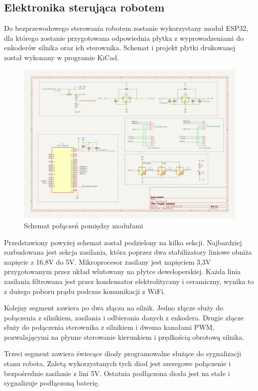 \subsection{Elektronika sterująca robotem}
Do bezprzewodowego sterowania robotem zostanie wykorzystany moduł ESP32, dla którego zostanie przygotowana odpowiednia płytka 
z wyprowadzeniami do enkoderów silnika oraz ich sterownika. Schemat i projekt płytki drukowanej został wykonany w programie KiCad. 
\begin{figure}[H]
	\centering
	\includegraphics[width=18cm]{pages/robot/zdjecia/kicad/schematCaly.png}
	\caption{Schemat połączeń pomiędzy modułami}
	\label{Fig:schematKiCad}
\end{figure}

Przedstawiony powyżej schemat został podzielony na kilka sekcji. 
Najbardziej rozbudowana jest sekcja zasilania, która poprzez dwa stabilizatory liniowe obniża napięcie z 16,8V do 5V. Mikroprocesor zasilany jest
napięciem 3,3V przygotowanym przez układ wlutowany na płytce deweloperskiej. Każda linia zasilania filtrowana jest przez kondensator elektrolityczny 
i ceramiczny, wynika to z dużego poboru prądu podczas komunikacji z WiFi. 

Kolejny segment zawiera po dwa złącza na silnik. Jedno złącze służy do połączenia z silnikiem, zasilania i odbierania danych z enkodera.
Drugie złącze służy do połączenia sterownika z silnikiem i dwoma kanałami PWM, pozwalającymi na płynne sterowanie kierunkiem i prędkością obrotową silnika.

Trzeci segment zawiera świecące diody programowalne służące do sygnalizacji stanu robota. Zaletą wykorzystanych tych diod jest szeregowe połączenie 
i bezpośrednie zasilanie z lini 5V. Ostatnia podłączona dioda jest na stałe i sygnalizuje podłączoną baterię.

